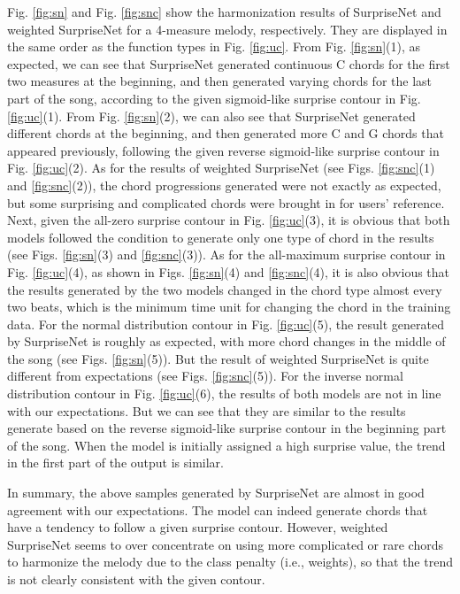 \documentclass{article}
\begin{document}
Fig. \ref{fig:sn} and Fig. \ref{fig:snc} show the harmonization results of SurpriseNet and weighted SurpriseNet for a 4-measure melody, respectively. They are displayed in the same order as the function types in Fig. \ref{fig:uc}.
From Fig. \ref{fig:sn}(1), as expected, we can see that SurpriseNet generated continuous C chords for the first two measures at the beginning, and then generated varying chords for the last part of the song, according to the given sigmoid-like surprise contour in Fig. \ref{fig:uc}(1). From Fig. \ref{fig:sn}(2), we can also see that SurpriseNet generated different chords at the beginning, and then generated more C and G chords that appeared previously, following the given reverse sigmoid-like surprise contour in Fig. \ref{fig:uc}(2). As for the results of weighted SurpriseNet (see Figs. \ref{fig:snc}(1) and \ref{fig:snc}(2)), the chord progressions generated were not exactly as expected, but some surprising and complicated chords were brought in for users' reference. Next, given the all-zero surprise contour in Fig. \ref{fig:uc}(3), it is obvious that both models followed the condition to generate only one type of chord in the results (see Figs. \ref{fig:sn}(3) and \ref{fig:snc}(3)). As for the all-maximum surprise contour in Fig. \ref{fig:uc}(4), as shown in Figs. \ref{fig:sn}(4) and \ref{fig:snc}(4), it is also obvious that the results generated by the two models changed in the chord type almost every two beats, which is the minimum time unit for changing the chord in the training data. For the normal distribution contour in Fig. \ref{fig:uc}(5), the result generated by SurpriseNet is roughly as expected, with more chord changes in the middle of the song (see Figs. \ref{fig:sn}(5)). But the result of weighted SurpriseNet is quite different from expectations (see Figs. \ref{fig:snc}(5)). For the inverse normal distribution contour in Fig. \ref{fig:uc}(6), the results of both models are not in line with our expectations. But we can see that they are similar to the results generate based on the reverse sigmoid-like surprise contour in the beginning part of the song. When the model is initially assigned a high surprise value, the trend in the first part of the output is similar.

In summary, the above samples generated by SurpriseNet are almost in good agreement with our expectations. The model can indeed generate chords that have a tendency to follow a given surprise contour. However, weighted SurpriseNet seems to over concentrate on using more complicated or rare chords to harmonize the melody due to the class penalty (i.e., weights), so that the trend is not clearly consistent with the given contour. 
\end{document}
